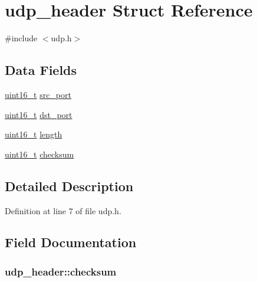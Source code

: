 \hypertarget{structudp__header}{\section{udp\+\_\+header Struct Reference}
\label{structudp__header}
}


{\ttfamily \#include $<$udp.\+h$>$}

\subsection*{Data Fields}
\begin{DoxyCompactItemize}
\item 
\hyperlink{aplus_8h_a5a8b2dc9e45a9ee81a94ef304fb62505}{uint16\+\_\+t} \hyperlink{structudp__header_ac0f7a492b8b7dd8e425d6517c7e9b3c2}{src\+\_\+port}
\item 
\hyperlink{aplus_8h_a5a8b2dc9e45a9ee81a94ef304fb62505}{uint16\+\_\+t} \hyperlink{structudp__header_a0cabb64601f3523a8defb137a90da96a}{dst\+\_\+port}
\item 
\hyperlink{aplus_8h_a5a8b2dc9e45a9ee81a94ef304fb62505}{uint16\+\_\+t} \hyperlink{structudp__header_a8129128b23a79dad769fc422f7b1c12b}{length}
\item 
\hyperlink{aplus_8h_a5a8b2dc9e45a9ee81a94ef304fb62505}{uint16\+\_\+t} \hyperlink{structudp__header_ad0ffcddf83678ff1305300db0dac33c5}{checksum}
\end{DoxyCompactItemize}


\subsection{Detailed Description}


Definition at line 7 of file udp.\+h.



\subsection{Field Documentation}
\hypertarget{structudp__header_ad0ffcddf83678ff1305300db0dac33c5}{
\subsubsection[{checksum}]{ udp\+\_\+header\+::checksum}}\label{structudp__header_ad0ffcddf83678ff1305300db0dac33c5}


